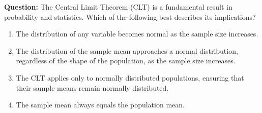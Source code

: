 \documentclass[12pt]{article}
\begin{document}
\textbf{Question:}  
The Central Limit Theorem (CLT) is a fundamental result in probability and statistics. Which of the following best describes its implications?  
\begin{enumerate}
    \item[(A)] The distribution of any variable becomes normal as the sample size increases.  
    \item[(B)] The distribution of the sample mean approaches a normal distribution, regardless of the shape of the population, as the sample size increases.  
    \item[(C)] The CLT applies only to normally distributed populations, ensuring that their sample means remain normally distributed.  
    \item[(D)] The sample mean always equals the population mean.  
\end{enumerate}
\end{document}
